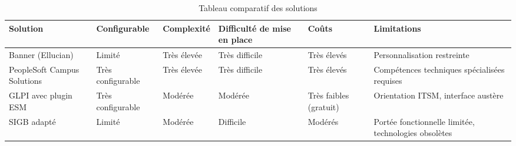 \begin{table}[h]
\centering
\caption{Tableau comparatif des solutions}
\begin{tabular}{|p{3.5cm}|p{2.2cm}|p{2cm}|p{2.5cm}|p{2cm}|p{3cm}|}
\hline
\textbf{Solution} & \textbf{Configurable} & \textbf{Complexité} & \textbf{Difficulté de mise en place} & \textbf{Coûts} & \textbf{Limitations} \\
\hline
Banner (Ellucian) & Limité & Très élevée & Très difficile & Très élevés & Personnalisation restreinte \\
\hline
PeopleSoft Campus Solutions & Très configurable & Très élevée & Très difficile & Très élevés & Compétences techniques spécialisées requises \\
\hline
GLPI avec plugin ESM & Très configurable & Modérée & Modérée & Très faibles (gratuit) & Orientation ITSM, interface austère \\
\hline
SIGB adapté & Limité & Modérée & Difficile & Modérés & Portée fonctionnelle limitée, technologies obsolètes \\
\hline
\end{tabular}
\end{table}

